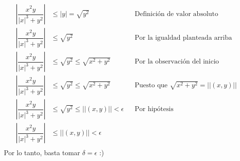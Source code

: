 \documentclass[letterpaper]{article}
\providecommand{\abs}[1]{\left|#1\right|}
\providecommand{\norm}[1]{\left|\left|#1\right|\right|}
\renewcommand{\*}{\cdot}
\theoremstyle{definition}
\begin{document}
\begin{align*}
	\abs{\dfrac{x^2y}{\abs{x}^3 + y^2}} &\leq \abs{y} = \sqrt{y^2} && \text{Definición de valor absoluto}\\
	\abs{\dfrac{x^2y}{\abs{x}^3 + y^2}} &\leq \sqrt{y^2} && \text{Por la igualdad planteada arriba}\\
	\abs{\dfrac{x^2y}{\abs{x}^3 + y^2}} &\leq \sqrt{y^2} \leq \sqrt{x^2 + y^2}&& \text{Por la observación del inicio}\\
	\abs{\dfrac{x^2y}{\abs{x}^3 + y^2}} &\leq \sqrt{y^2} \leq \sqrt{x^2 + y^2} && \text{Puesto que }\sqrt{x^2 + y^2} = \norm{(x,y)} \\
	\abs{\dfrac{x^2y}{\abs{x}^3 + y^2}} &\leq \sqrt{y^2} \leq \norm{(x,y)} < \epsilon && \text{Por hipótesis} \\
	\abs{\dfrac{x^2y}{\abs{x}^3 + y^2}} &\leq \norm{(x,y)} < \epsilon \\
\end{align*}
Por lo tanto, basta tomar $ \delta = \epsilon $ :)
\end{document}
